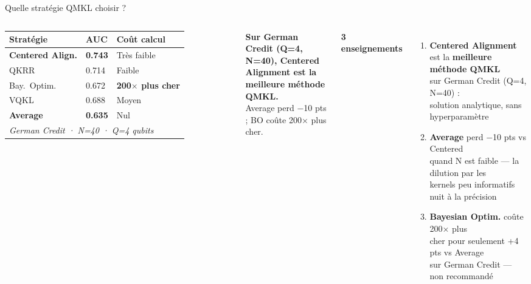 \documentclass[aspectratio=169]{beamer}
\newcommand{\good}[1]{\textcolor{okgreen}{\textbf{#1}}}
\newcommand{\bad}[1]{\textcolor{badred}{\textbf{#1}}}
\begin{document}
\begin{frame}{Quelle stratégie QMKL choisir ?}
  \begin{columns}[T]
      \small
      \begin{tabular}{p{2.5cm}p{1.4cm}p{2.2cm}}
        \toprule
        \textbf{Stratégie} & \textbf{AUC} & \textbf{Coût calcul} \\
        \midrule
        \good{Centered Align.} & \good{0.743} & Très faible \\
        QKRR               & 0.714        & Faible \\
        Bay.\ Optim.       & 0.672        & \bad{200$\times$ plus cher} \\
        VQKL               & 0.688        & Moyen \\
        \bad{Average}      & \bad{0.635}  & Nul \\
        \midrule
        \multicolumn{3}{l}{\footnotesize\textit{German Credit · N=40 · Q=4 qubits}} \\
        \bottomrule
      \end{tabular}

      \medskip\small
      \textbf{Sur German Credit (Q=4, N=40), Centered\\
      Alignment est la meilleure méthode QMKL.}\\[2pt]
      Average perd $-$10 pts ; BO coûte 200$\times$ plus cher.

      \textbf{3 enseignements}\\[6pt]
      \begin{enumerate}
        \item \good{Centered Alignment} est la \textbf{meilleure méthode QMKL}\\
              sur German Credit (Q=4, N=40) :\\
              solution analytique, sans hyperparamètre

        \bigskip
        \item \bad{Average} perd $-$10 pts vs Centered\\
              quand N est faible — la dilution par les\\
              kernels peu informatifs nuit à la précision

        \bigskip
        \item \bad{Bayesian Optim.} coûte 200$\times$ plus\\
              cher pour seulement +4 pts vs Average\\
              sur German Credit — non recommandé
      \end{enumerate}


  \end{columns}
\end{frame}
\end{document}
